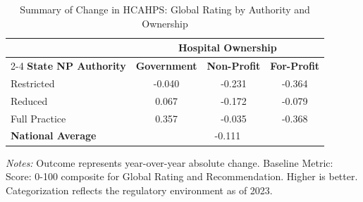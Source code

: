 \begin{table}[htbp]
    \centering
    \caption{Summary of Change in HCAHPS: Global Rating by Authority and Ownership}
    \label{tab:d_hcahps_grp4_own}
    \vspace{0.2cm}
    \begin{tabular}{lccc}
        \toprule
        & \multicolumn{3}{c}{\textbf{Hospital Ownership}} \\
        \cmidrule(lr){2-4}
        \textbf{State NP Authority} & \textbf{Government} & \textbf{Non-Profit} & \textbf{For-Profit} \\
        \midrule
        Restricted & -0.040 & -0.231 & -0.364 \\
        Reduced & 0.067 & -0.172 & -0.079 \\
        Full Practice & 0.357 & -0.035 & -0.368 \\
        \midrule
        \textbf{National Average} & \multicolumn{3}{c}{-0.111} \\
        \bottomrule
    \end{tabular}
    \vspace{0.1cm}
    \begin{minipage}{0.85\textwidth}
        \footnotesize \textit{Notes:} Outcome represents year-over-year absolute change. Baseline Metric: Score: 0-100 composite for Global Rating and Recommendation. Higher is better. Categorization reflects the regulatory environment as of 2023.
    \end{minipage}
\end{table}